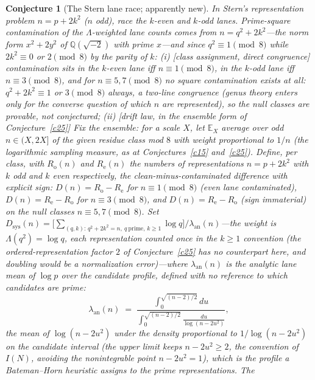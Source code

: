 \documentclass[11pt]{article}
\newtheorem{conjecture}{Conjecture}
\theoremstyle{definition}
\begin{document}
\setcounter{conjecture}{11}%
\begin{conjecture}[The Stern lane race; apparently new]\label{c14}
In Stern's representation problem $n=p+2k^2$ ($n$ odd), race the
$k$-even and $k$-odd lanes.  Prime-square contamination of the
$\Lambda$-weighted lane counts comes from $n=q^2+2k^2$---the norm
form $x^2+2y^2$ of $\mathbb Q(\sqrt{-2})$ with prime $x$---and since
$q^2\equiv1\pmod8$ while $2k^2\equiv0$ or $2\pmod 8$ by the parity of
$k$:
\emph{(i)} [class assignment, direct congruence] contamination
sits in the $k$-\emph{even} lane iff $n\equiv1\pmod8$, in the
$k$-\emph{odd} lane iff $n\equiv3\pmod8$, and for
$n\equiv5,7\pmod8$ \emph{no} square contamination exists at all:
$q^2+2k^2\equiv1$ or $3\pmod 8$ always, a two-line congruence (genus theory
enters only for the converse question of
which $n$ \emph{are} represented), so the null classes
are provable, not conjectured;
\emph{(ii)} [drift law, in the ensemble form of
Conjecture~\ref{c25}]  Fix the
ensemble: for a scale $X$, let
$\mathbb E_X$ average over odd $n\in(X,2X]$ of the given residue
class mod $8$ with weight proportional to $1/n$ (the logarithmic
sampling measure, as at Conjectures~\ref{c15} and~\ref{c25}).
Define, per class, with $R_{\mathrm o}(n)$ and $R_{\mathrm e}(n)$ the numbers of representations $n=p+2k^2$ with $k$ odd and $k$ even respectively, the \emph{clean-minus-contaminated} difference with explicit sign: $D(n)=R_{\mathrm o}-R_{\mathrm e}$ for
$n\equiv1\pmod 8$ (even lane contaminated),
$D(n)=R_{\mathrm e}-R_{\mathrm o}$ for $n\equiv3\pmod 8$, and
$D(n)=R_{\mathrm e}-R_{\mathrm o}$ (sign immaterial) on the null
classes $n\equiv5,7\pmod8$.  Set
$D_{\mathrm{sys}}(n)=\bigl[\sum_{(q,k):\,q^2+2k^2=n,\ q\
\mathrm{prime},\,k\ge1}\log q\bigr]/\lambda_{\mathrm{an}}(n)$---the weight is
$\Lambda(q^2)=\log q$, each representation counted once in the
$k\ge1$ convention (the ordered-representation factor $2$ of
Conjecture~\ref{c25} has no counterpart here, and doubling would be a
normalization error)---where
$\lambda_{\mathrm{an}}(n)$ is the \emph{analytic} lane mean of
$\log p$ over the candidate profile, defined with no reference to
which candidates are prime:
\[
\lambda_{\mathrm{an}}(n)\;=\;
\frac{\displaystyle\int_0^{\sqrt{(n-2)/2}}du}
{\displaystyle\int_0^{\sqrt{(n-2)/2}}\frac{du}{\log(n-2u^2)}},
\]
the mean of $\log(n-2u^2)$ under the density proportional to $1/\log(n-2u^2)$ on the candidate interval (the upper limit keeps $n-2u^2\ge2$, the convention of $I(N)$, avoiding the nonintegrable point $n-2u^2=1$), which is the profile a
Bateman--Horn heuristic assigns to the prime representations.  The

\end{conjecture}
\end{document}
